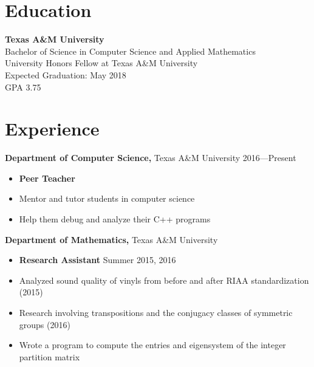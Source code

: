 \documentclass[resmargin, line]{res}
\begin{document}
 
 
 
\address{22619 Arbor Stream Dr. 
\\ Katy, TX 77450 \\ (832)-683-9857}

\address{\href{www.mattgaikema.com}{mattgaikema.com} \\
\href{https://github.com/TexAgg}{github.com/TexAgg} \\
\href{mailto:mgaikema1@gmail.com}{mgaikema1@gmail.com}}

 
\begin{resume} 


\section{Education}
{\bf Texas A\&M University} \\
Bachelor of Science in Computer Science and Applied Mathematics \\
University Honors Fellow at Texas A\&M University \\
Expected Graduation: May 2018 \\ 
GPA 3.75


\section{Experience}
{\bf  Department of Computer Science,} Texas A\&M University \hfill 2016---Present
\begin{itemize} \itemsep -2pt
    \item[] {\bf Peer Teacher}
    \item Mentor and tutor students in computer science
    \item Help them debug and analyze their C++ programs
\end{itemize}

{\bf Department of Mathematics,} Texas A\&M University
\begin{itemize} \itemsep -2pt  %
    \item[] {\bf Research Assistant} \hfill Summer 2015, 2016
    \item Analyzed sound quality of vinyls from before and after
    RIAA standardization (2015)
    \item Research involving transpositions and
    the conjugacy classes of symmetric groups (2016)
    \item Wrote a program to compute the entries and eigensystem of the integer partition matrix


\end{itemize}
\end{resume}
\end{document}
